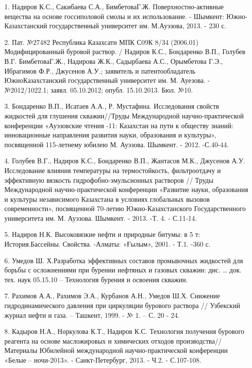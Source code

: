\begin{noparindent}
1.
  Надиров К.С., Сакибаева С.А., БимбетоваГ.Ж. Поверхностно-активные
  вещества на основе госсиполовой смолы и их использование. - Шымкент:
  Южно-Казахстанский государственный университет им. М.Ауэзова, 2013. -
  230 с.

2.
  Пат. №27482 Республика Казахсатн МПК С09К 8/34 (2006.01)
  Модифицированный буровой раствор. / Надиров К.С., Бондаренко В.П.,
  Голубев В.Г. БимбетоваГ.Ж., Надирова Ж.К., Садырбаева А.С., Орымбетова
  Г.Э., Ибрагимов Ф.Р., Джусенов А.У.; заявитель и патентообладатель
  ЮжноКазахстанский государственный университет им. М. Ауезова.
  -№2012/1022.1; заявл. 05.10.2012; опубл. 15.10.2013. Бюл. №10.

3.
  Бондаренко В.П., Исатаев А.А., Р. Мустафина. Исследования свойств
  жидкостей для глушения скважин//Труды Международной
  научно-практической конференции «Ауэзовские чтения -11: Казахстан на
  пути к обществу знаний: инновационные направления развития науки,
  образования и культуры», посвященной 115-летнему юбилею М. Ауэзова.
  Шымкент. - 2012. -С.40-44.

4.
  Голубев В.Г., Надиров К.С., Бондаренко В.П., Жантасов М.К., Джусенов
  А.У. Исследование влияния температуры на термостойкость, фильтроотдачу
  и эффективную вязкость гидрофобно-эмульсионных растворов // Труды
  Международной научно-практической конференции «Развитие науки,
  образования и культуры независимого Казахстана в условиях глобальных
  вызовов современности», посвященной 70-летию Южно-Казахстанского
  Государственного университета им. М. Ауэзова. Шымкент. - 2013. -Т. 4.
  - С.11-14.

5.
  Надиров Н.К. Высоковязкие нефти и природные битумы: в 5 т:
  История.Бассейны. Свойства. -Алматы: «Ғылым», 2001. - Т.1. -360 с.

6.
  Умедов Ш. Х.Разработка эффективных составов промывочных жидкостей для
  борьбы с осложнениями при бурении нефтяных и газовых скважин: дис.
  \ldots{} док. тех. наук 05.15.10 -- Технология бурения и освоения
  скважин.

7.
  Рахимов А.А., Рахимов Э.А., Курбанов А.Н., Умедов Ш.Х. Снижение
  гидродинамического давления при циркуляции бурового раствора //
  Узбекский журнал нефти и газа. -- Ташкент, 1999. - № 1. -- С. 20 - 24.

8.
  Кадыров Н.А., Норкулова К.Т., Надиров К.С. Технология получения
  бурового реагента на основе масложировых и химических отходов
  производства// Материалы Юбилейной международной научно-практической
  конференции «Белые -- ночи-2013». - Санкт-Петербург, 2013. - Ч.2. -
  С.107-108.


\end{noparindent}
